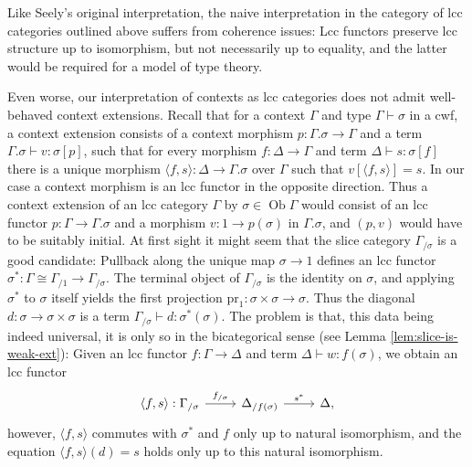 \documentclass[a4paper]{article}
\theoremstyle{remark}
\theoremstyle{definition}
\begin{document}
Like Seely's original interpretation, the naive interpretation in the category of lcc categories outlined above suffers from coherence issues:
Lcc functors preserve lcc structure up to isomorphism, but not necessarily up to equality, and the latter would be required for a model of type theory.

Even worse, our interpretation of contexts as lcc categories does not admit well-behaved context extensions.
Recall that for a context $\Gamma$ and type $\Gamma \vdash \sigma$ in a cwf, a context extension consists of a context morphism $p : \Gamma.\sigma \rightarrow \Gamma$ and a term $\Gamma.\sigma \vdash v : \sigma[p]$, such that for every morphism $f : \Delta \rightarrow \Gamma$ and term $\Delta \vdash s : \sigma[f]$ there is a unique morphism $\langle f, s \rangle : \Delta \rightarrow \Gamma.\sigma$ over $\Gamma$ such that $v[\langle f, s \rangle] = s$.
In our case a context morphism is an lcc functor in the opposite direction.
Thus a context extension of an lcc category $\Gamma$ by $\sigma \in \operatorname{Ob} \Gamma$ would consist of an lcc functor $p : \Gamma \rightarrow \Gamma.\sigma$ and a morphism $v : 1 \rightarrow p(\sigma)$ in $\Gamma.\sigma$, and $(p, v)$ would have to be suitably initial.
At first sight it might seem that the slice category $\Gamma_{/ \sigma}$ is a good candidate:
Pullback along the unique map $\sigma \rightarrow 1$ defines an lcc functor $\sigma^* : \Gamma \cong \Gamma_{/ 1} \rightarrow \Gamma_{/ \sigma}$.
The terminal object of $\Gamma_{/ \sigma}$ is the identity on $\sigma$, and applying $\sigma^*$ to $\sigma$ itself yields the first projection $\mathrm{pr}_1 : \sigma \times \sigma \rightarrow \sigma$.
Thus the diagonal $d : \sigma \rightarrow \sigma \times \sigma$ is a term $\Gamma_{/ \sigma} \vdash d : \sigma^*(\sigma)$.
The problem is that, this data being indeed universal, it is only so in the bicategorical sense (see Lemma \ref{lem:slice-is-weak-ext}):
Given an lcc functor $f : \Gamma \rightarrow \Delta$ and term $\Delta \vdash w : f(\sigma)$, we obtain an lcc functor
\begin{equation}
  \begin{tikzcd}
    \langle f, s \rangle : \Gamma_{/ \sigma} \arrow[r, "{f_{/ \sigma}}"] & \Delta_{/ f(\sigma)} \arrow[r, "s^*"] & \Delta,
  \end{tikzcd}
\end{equation}
however, $\langle f, s \rangle$ commutes with $\sigma^*$ and $f$ only up to natural isomorphism, and the equation $\langle f, s \rangle(d) = s$ holds only up to this natural isomorphism.
\end{document}
